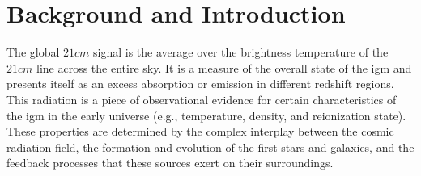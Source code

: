 \documentclass[%
 reprint,
 amsmath,amssymb,
 aps,
]{revtex4-2}
\begin{document}

\section{Background and Introduction}
The global $21cm$ signal is the average over the brightness temperature of the $21cm$ line across the entire sky. It is a measure of the overall state of the \gls{igm} and presents itself as an excess absorption or emission in different redshift regions. This radiation is a piece of observational evidence for certain characteristics of the \gls{igm} in the early universe (e.g., temperature, density, and reionization state). These properties are determined by the complex interplay between the cosmic radiation field, the formation and evolution of the first stars and galaxies, and the feedback processes that these sources exert on their surroundings\cite{21century}.\par
\end{document}
